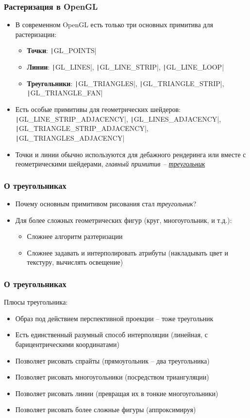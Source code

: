 \documentclass[10pt]{beamer}
\begin{document}
\begin{frame}[fragile]
\frametitle{Растеризация в OpenGL}
\begin{itemize}
\item В современном OpenGL есть только три основных примитива для растеризации:
\pause
\begin{itemize}
\item \textbf{Точки}: \texttt|GL_POINTS|
\pause
\item \textbf{Линии}: \texttt|GL_LINES|, \texttt|GL_LINE_STRIP|, \texttt|GL_LINE_LOOP|
\pause
\item \textbf{Треугольники}: \texttt|GL_TRIANGLES|, \texttt|GL_TRIANGLE_STRIP|, \texttt|GL_TRIANGLE_FAN|
\end{itemize}
\pause
\item Есть особые примитивы для геометрических шейдеров: \texttt|GL_LINE_STRIP_ADJACENCY|, \texttt|GL_LINES_ADJACENCY|, \texttt|GL_TRIANGLE_STRIP_ADJACENCY|, \texttt|GL_TRIANGLES_ADJACENCY|
\pause
\item Точки и линии обычно используются для дебажного рендеринга или вместе с геометрическими шейдерами, \textit{главный примитив -- \underline{треугольник}}
\end{itemize}
\end{frame}

\begin{frame}
\frametitle{О треугольниках}
\begin{itemize}
\item Почему основным примитивом рисования стал \textit{треугольник}?
\pause
\item Для более сложных геометрических фигур (круг, многоугольник, и т.д.):
\pause
\begin{itemize}
\item Сложнее алгоритм разтеризации
\pause
\item Сложнее задавать и интерполировать атрибуты (накладывать цвет и текстуру, вычислять освещение)
\end{itemize}
\end{itemize}
\end{frame}

\begin{frame}
\frametitle{О треугольниках}
Плюсы треугольника:
\pause
\begin{itemize}
\item Образ под действием перспективной проекции -- тоже треугольник
\pause
\item Есть единственный разумный способ интерполяции (линейная, с барицентрическими координатами)
\pause
\item Позволяет рисовать спрайты (прямоугольник -- два треугольника)
\pause
\item Позволяет рисовать многоугольники (посредством триангуляции)
\pause
\item Позволяет рисовать линии (превращая их в тонкие многоугольники)
\pause
\item Позволяет рисовать более сложные фигуры (аппроксимируя)
\end{itemize}
\end{frame}
\end{document}
